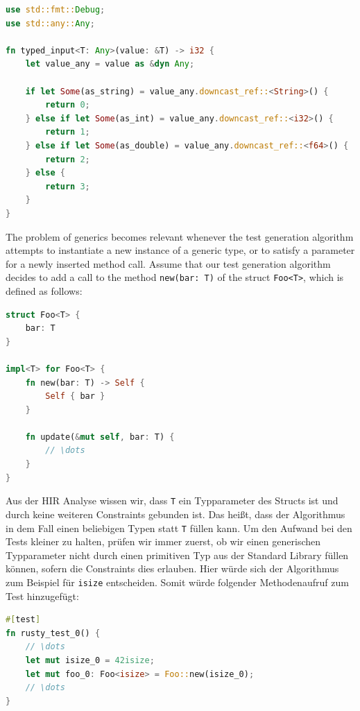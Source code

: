 \documentclass{article}
\begin{document}
\begin{lstlisting}[language=Rust, style=boxed, caption={The execution path of the generic Rust function depends on the concrete type of the argument}, label=lst:rust-runtime-reflection]
use std::fmt::Debug;
use std::any::Any;

fn typed_input<T: Any>(value: &T) -> i32 {
    let value_any = value as &dyn Any;

    if let Some(as_string) = value_any.downcast_ref::<String>() {
        return 0;
    } else if let Some(as_int) = value_any.downcast_ref::<i32>() {
        return 1;
    } else if let Some(as_double) = value_any.downcast_ref::<f64>() {
        return 2;
    } else {
        return 3;
    }
}
\end{lstlisting}

The problem of generics becomes relevant whenever the test generation algorithm attempts to instantiate a new instance of a generic type, or to satisfy a parameter for a newly inserted method call. Assume that our test generation algorithm decides to add a call to the method \lstinline{new(bar: T)} of the struct \lstinline{Foo<T>}, which is defined as follows:
\begin{lstlisting}[language=Rust, style=boxed, caption={}, label=lst:basic-generics-example]
struct Foo<T> {
    bar: T
}

impl<T> for Foo<T> {
    fn new(bar: T) -> Self {
        Self { bar }
    }

    fn update(&mut self, bar: T) {
        // \dots
    }
}
\end{lstlisting}

Aus der \ac{HIR} Analyse wissen wir, dass \lstinline{T} ein Typparameter des Structs ist und durch keine weiteren Constraints gebunden ist. Das heißt, dass der Algorithmus in dem Fall einen beliebigen Typen statt \lstinline{T} füllen kann. Um den Aufwand bei den Tests kleiner zu halten, prüfen wir immer zuerst, ob wir einen generischen Typparameter nicht durch einen primitiven Typ aus der Standard Library füllen können, sofern die Constraints dies erlauben. Hier würde sich der Algorithmus zum Beispiel für \lstinline{isize} entscheiden. Somit würde folgender Methodenaufruf zum Test hinzugefügt:

\begin{lstlisting}[language=Rust, style=boxed, caption={}, label=lst:building-generic-test-1]
#[test]
fn rusty_test_0() {
    // \dots
    let mut isize_0 = 42isize;
    let mut foo_0: Foo<isize> = Foo::new(isize_0);
    // \dots
}
\end{lstlisting}
\end{document}
